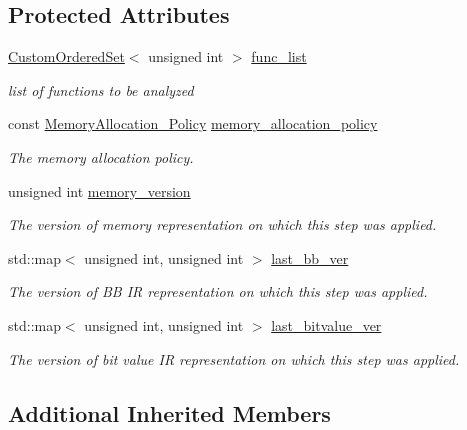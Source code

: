 \subsection*{Protected Attributes}
\begin{DoxyCompactItemize}
\item 
\hyperlink{classCustomOrderedSet}{Custom\+Ordered\+Set}$<$ unsigned int $>$ \hyperlink{classmemory__allocation_af4a1145d8ed329af6c89a3abd67407fd}{func\+\_\+list}
\begin{DoxyCompactList}\small\item\em list of functions to be analyzed \end{DoxyCompactList}\item 
const \hyperlink{memory__allocation_8hpp_aad85c6dac5893e8093336373dd19539b}{Memory\+Allocation\+\_\+\+Policy} \hyperlink{classmemory__allocation_a42529c8d173922759948b7c4da5651ac}{memory\+\_\+allocation\+\_\+policy}
\begin{DoxyCompactList}\small\item\em The memory allocation policy. \end{DoxyCompactList}\item 
unsigned int \hyperlink{classmemory__allocation_a6b44f510a470571378302da9dade4297}{memory\+\_\+version}
\begin{DoxyCompactList}\small\item\em The version of memory representation on which this step was applied. \end{DoxyCompactList}\item 
std\+::map$<$ unsigned int, unsigned int $>$ \hyperlink{classmemory__allocation_a6f738971fa5c035e7fbc6194f1a715c6}{last\+\_\+bb\+\_\+ver}
\begin{DoxyCompactList}\small\item\em The version of BB IR representation on which this step was applied. \end{DoxyCompactList}\item 
std\+::map$<$ unsigned int, unsigned int $>$ \hyperlink{classmemory__allocation_a1838e262151b179c199161437b482c97}{last\+\_\+bitvalue\+\_\+ver}
\begin{DoxyCompactList}\small\item\em The version of bit value IR representation on which this step was applied. \end{DoxyCompactList}\end{DoxyCompactItemize}
\subsection*{Additional Inherited Members}



